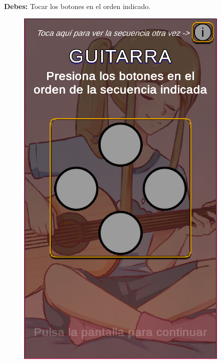 \textbf{Debes:} Tocar los botones en el orden indicado.

\begin{figure}[h]
	\centering
	\begin{minipage}{0.45\textwidth}
   		\includegraphics[scale=.5]{imgs/screenshot13.png}
	\end{minipage}
	\begin{minipage}{0.45\textwidth}
		\begin{flushright}

\end{flushright}
\end{minipage}
\end{figure}
